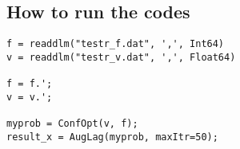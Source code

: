 \documentclass{article} %
\begin{document}
\subsection{How to run the codes}
\begin{lstlisting}
f = readdlm("testr_f.dat", ',', Int64)
v = readdlm("testr_v.dat", ',', Float64)

f = f.';
v = v.';

myprob = ConfOpt(v, f);
result_x = AugLag(myprob, maxItr=50);
\end{lstlisting}
\end{document}
